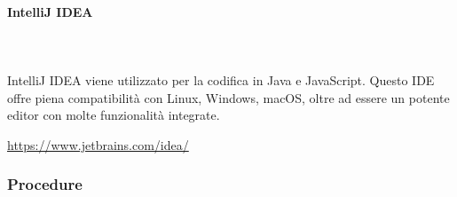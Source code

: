 \paragraph{IntelliJ IDEA} \mbox{}\\ \mbox{}\\
IntelliJ IDEA viene utilizzato per la codifica in Java e JavaScript. Questo 
IDE offre piena compatibilità con Linux, Windows, macOS, oltre ad essere un 
potente editor con molte funzionalità integrate. \newline
\centerline{\url{https://www.jetbrains.com/idea/}}

\subsubsection{Procedure}